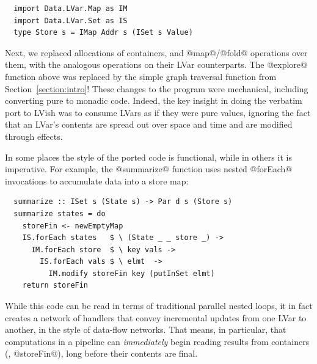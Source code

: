 
\begin{lstlisting}
  import Data.LVar.Map as IM
  import Data.LVar.Set as IS
  type Store s = IMap Addr s (ISet s Value)
\end{lstlisting}
%
Next, we replaced allocations of containers, and @map@/@fold@ operations
over them, with the analogous operations on their LVar counterparts.
%
The @explore@ function above was replaced by the
simple graph traversal function from Section~\ref{section:intro}!  
%
These changes to the program were mechanical, including converting pure
to monadic code.
Indeed, the key insight in doing the verbatim port to LVish
was to consume LVars as if they were pure
values, ignoring the fact that an LVar's contents are spread out over space and time and
are modified through effects.

In some places the style of the ported code is functional, while in others it is
imperative.  For example, the @summarize@ function uses nested @forEach@
invocations to accumulate data into a store map:
\begin{lstlisting}
  summarize :: ISet s (State s) -> Par d s (Store s)
  summarize states = do
    storeFin <- newEmptyMap
    IS.forEach states   $ \ (State _ _ store _) -> 
      IM.forEach store  $ \ key vals -> 
        IS.forEach vals $ \ elmt  -> 
          IM.modify storeFin key (putInSet elmt)
    return storeFin    
\end{lstlisting}
While this code can be read in terms of traditional parallel nested loops, it in
fact creates a network of handlers that convey incremental updates from one LVar
to another, in the style of data-flow networks.  That means, in particular, that
computations in a pipeline can \emph{immediately} begin reading
results from containers (\eg, @storeFin@), long before their contents are final.


